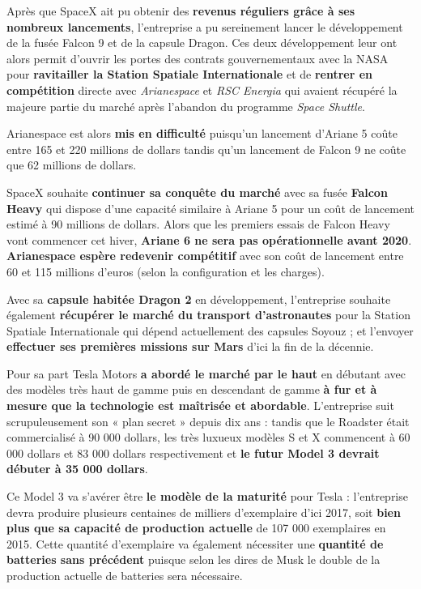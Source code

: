 Après que SpaceX ait pu obtenir des \textbf{revenus réguliers grâce à ses nombreux lancements}, l'entreprise a pu sereinement lancer le développement de la fusée Falcon 9 et de la capsule Dragon. Ces deux développement leur ont alors permit d'ouvrir les portes des contrats gouvernementaux avec la NASA pour \textbf{ravitailler la Station Spatiale Internationale} et de \textbf{rentrer en compétition} directe avec \textit{Arianespace} et \textit{RSC Energia} qui avaient récupéré la majeure partie du marché après l'abandon du programme \textit{Space Shuttle}.

Arianespace est alors \textbf{mis en difficulté} puisqu'un lancement d'Ariane 5 coûte entre 165 et 220 millions de dollars\supercite{Ariane5Cost} tandis qu'un lancement de Falcon 9 ne coûte que 62 millions de dollars\supercite{FalconCost}. 

SpaceX souhaite \textbf{continuer sa conquête du marché} avec sa fusée \textbf{Falcon Heavy} qui dispose d'une capacité similaire à Ariane 5 pour un coût de lancement estimé à 90 millions de dollars. Alors que les premiers essais de Falcon Heavy vont commencer cet hiver\supercite{FalconHeavyFirstLaunch}, \textbf{Ariane 6 ne sera pas opérationnelle avant 2020}\supercite{Ariane6Debuts}. \textbf{Arianespace espère redevenir compétitif} avec son coût de lancement entre 60 et 115 millions d'euros (selon la configuration et les charges)\supercite{Ariane6Cost}.

Avec sa \textbf{capsule habitée Dragon 2} en développement, l'entreprise souhaite également \textbf{récupérer le marché du transport d'astronautes} pour la Station Spatiale Internationale qui dépend actuellement des capsules Soyouz ; et l'envoyer \textbf{effectuer ses premières missions sur Mars} d'ici la fin de la décennie\supercite{ElonMuskMars2020}.

\vspace{5mm}

Pour sa part Tesla Motors \textbf{a abordé le marché par le haut} en débutant avec des modèles très haut de gamme puis en descendant de gamme \textbf{à fur et à mesure que la technologie est maîtrisée et abordable}. L'entreprise suit scrupuleusement son « plan secret »\supercite{TeslaSecretMasterPlan} depuis dix ans : tandis que le Roadster était commercialisé à 90 000 dollars, les très luxueux modèles S et X commencent à 60 000 dollars et 83 000 dollars respectivement et \textbf{le futur Model 3 devrait débuter à 35 000 dollars}.

Ce Model 3 va s'avérer être \textbf{le modèle de la maturité} pour Tesla : l'entreprise devra produire plusieurs centaines de milliers d'exemplaire d'ici 2017, soit \textbf{bien plus que sa capacité de production actuelle} de 107 000 exemplaires en 2015\supercite{Tesla2015FullYearUpdate}. Cette quantité d'exemplaire va également nécessiter une \textbf{quantité de batteries sans précédent} puisque selon les dires de Musk\supercite{Model3Unveil} le double de la production actuelle de batteries sera nécessaire.

